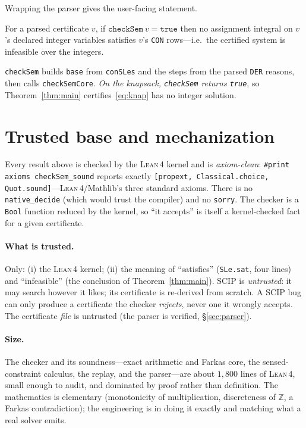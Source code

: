\documentclass[runningheads]{llncs}
\newcommand{\code}[1]{\texttt{#1}}
\newcommand{\Z}{\mathbb{Z}}
\newcommand{\scip}{\textsc{SCIP}}
\newcommand{\lean}{\textsc{Lean\,4}}
\begin{document}
Wrapping the parser gives the user-facing statement.

\begin{theorem}[\code{checkSem\_sound}]\label{thm:main}
For a parsed certificate $v$, if $\code{checkSem}\ v=\mathtt{true}$ then no assignment
integral on $v$'s declared integer variables satisfies $v$'s \code{CON} rows---i.e.\ the
certified system is infeasible over the integers.
\end{theorem}
\code{checkSem} builds \code{base} from \code{conSLes} and the steps from the parsed
\code{DER} reasons, then calls \code{checkSemCore}. \emph{On the knapsack, \code{checkSem}
returns \code{true}}, so Theorem~\ref{thm:main} certifies~\eqref{eq:knap} has no integer
solution.

\section{Trusted base and mechanization}\label{sec:tcb}

Every result above is checked by the \lean{} kernel and is \emph{axiom-clean}:
\code{\#print axioms checkSem\_sound} reports exactly \code{[propext,
Classical.choice, Quot.sound]}---\lean{}/Mathlib's three standard axioms. There is no
\code{native\_decide} (which would trust the compiler) and no \code{sorry}. The checker
is a \code{Bool} function reduced by the kernel, so ``it accepts'' is itself a
kernel-checked fact for a given certificate.

\paragraph{What is trusted.} Only: (i) the \lean{} kernel; (ii) the meaning of
``satisfies'' (\code{SLe.sat}, four lines) and ``infeasible'' (the conclusion of
Theorem~\ref{thm:main}). \scip{} is \emph{untrusted}: it may search however it likes;
its certificate is re-derived from scratch. A \scip{} bug can only produce a certificate
the checker \emph{rejects}, never one it wrongly accepts. The certificate \emph{file} is
untrusted (the parser is verified, \S\ref{sec:parser}).

\paragraph{Size.} The checker and its soundness---exact arithmetic and Farkas core,
the sensed-constraint calculus, the replay, and the parser---are about
$1{,}800$ lines of \lean{}, small enough to audit, and dominated by proof rather than
definition. The mathematics is elementary (monotonicity of multiplication, discreteness
of $\Z$, a Farkas contradiction); the engineering is in doing it exactly and matching
what a real solver emits.
\end{document}
